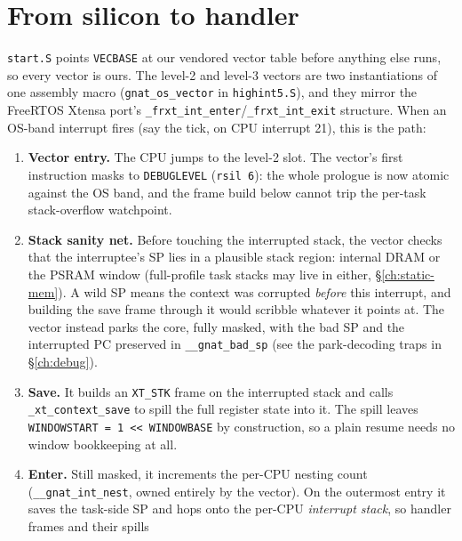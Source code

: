 \section{From silicon to handler}

\texttt{start.S} points \texttt{VECBASE} at our vendored vector table before
anything else runs, so every vector is ours. The level-2 and level-3 vectors
are two instantiations of one assembly macro (\texttt{gnat\_os\_vector} in
\texttt{highint5.S}), and they mirror the FreeRTOS Xtensa port's
\texttt{\_frxt\_int\_enter}/\texttt{\_frxt\_int\_exit} structure. When an
OS-band interrupt fires (say the tick, on CPU interrupt 21), this is the path:

\begin{enumerate}
  \item \textbf{Vector entry.} The CPU jumps to the level-2 slot. The
        vector's first instruction masks to \texttt{DEBUGLEVEL}
        (\texttt{rsil 6}): the whole prologue is now atomic against the OS
        band, and the frame build below cannot trip the per-task
        stack-overflow watchpoint.
  \item \textbf{Stack sanity net.} Before touching
        the interrupted stack, the vector checks that the interruptee's SP
        lies in a plausible stack region: internal DRAM or the PSRAM window
        (full-profile task stacks may live in either,
        \S\ref{ch:static-mem}). A wild SP means the context was corrupted
        \emph{before} this interrupt, and building the save frame through it
        would scribble whatever it points at. The vector instead parks the
        core, fully masked, with the bad SP and the interrupted PC preserved
        in \texttt{\_\_gnat\_bad\_sp} (see the park-decoding traps in
        \S\ref{ch:debug}).
  \item \textbf{Save.} It builds an \texttt{XT\_STK} frame on the
        interrupted stack and calls \texttt{\_xt\_context\_save} to spill the
        full register state into it. The spill leaves
        \texttt{WINDOWSTART = 1 << WINDOWBASE} by construction, so a plain
        resume needs no window bookkeeping at all.
  \item \textbf{Enter.} Still masked, it increments the per-CPU nesting
        count (\texttt{\_\_gnat\_int\_nest}, owned entirely by the vector).
        On the outermost entry it saves the task-side SP and hops onto the
        per-CPU \emph{interrupt stack}, so handler frames and their spills

\end{enumerate}
